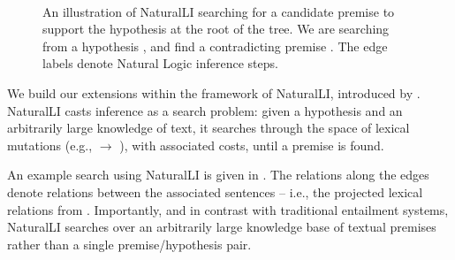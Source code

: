 
%
%

\begin{figure}[t]
\begin{center}
  \resizebox{0.48\textwidth}{!}{\teaserSearch} \\
\end{center}
\caption{
  An illustration of NaturalLI searching for a candidate premise
  to support the hypothesis at the root of the tree.
  We are searching from a hypothesis
  , and find a contradicting
  premise .
  The edge labels denote Natural Logic inference steps.
  \label{fig:naturalli}
}
\end{figure}

We build our extensions within the framework of NaturalLI, introduced
  by .
NaturalLI casts inference as a search problem: given a hypothesis and an arbitrarily
  large knowledge of text, it searches through the space of
  lexical mutations (e.g.,  $\rightarrow$ ), 
  with associated costs, until a premise is found.

An example search using NaturalLI is given in .
The relations along the edges denote relations between the associated sentences
  -- i.e., the projected lexical relations from .
Importantly, and in contrast with traditional entailment systems, NaturalLI
  searches over an arbitrarily large knowledge base of textual premises rather
  than a single premise/hypothesis pair.

